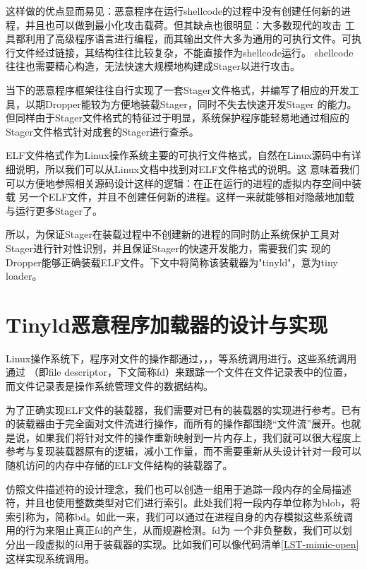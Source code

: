 这样做的优点显而易见：恶意程序在运行shellcode的过程中没有创建任何新的进程，并且也可以做到最小化攻击载荷。但其缺点也很明显：大多数现代的攻击
工具都利用了高级程序语言进行编程，而其输出文件大多为通用的可执行文件。可执行文件经过链接，其结构往往比较复杂，不能直接作为shellcode运行。
shellcode往往也需要精心构造，无法快速大规模地构建成Stager以进行攻击。

当下的恶意程序框架往往自行实现了一套Stager文件格式，并编写了相应的开发工具，以期Dropper能较为方便地装载Stager，同时不失去快速开发Stager
的能力。但同样由于Stager文件格式的特征过于明显，系统保护程序能轻易地通过相应的Stager文件格式针对成套的Stager进行查杀。

ELF文件格式作为Linux操作系统主要的可执行文件格式，自然在Linux源码中有详细说明，所以我们可以从Linux文档中找到对ELF文件格式的说明。这
意味着我们可以方便地参照相关源码设计这样的逻辑：在正在运行的进程的虚拟内存空间中装载
另一个ELF文件，并且不创建任何新的进程。这样一来就能够相对隐蔽地加载与运行更多Stager了。

所以，为保证Stager在装载过程中不创建新的进程的同时防止系统保护工具对Stager进行针对性识别，并且保证Stager的快速开发能力，需要我们实
现的Dropper能够正确装载ELF文件。下文中将简称该装载器为"tinyld"，意为tiny loader。

\section{Tinyld恶意程序加载器的设计与实现}

Linux操作系统下，程序对文件的操作都通过，，，等系统调用进行。这些系统调用通过
（即file descriptor，下文简称fd）来跟踪一个文件在文件记录表中的位置，而文件记录表是操作系统管理文件的数据结构。

为了正确实现ELF文件的装载器，我们需要对已有的装载器的实现进行参考。已有的装载器由于完全面对文件流进行操作，而所有的操作都围绕“文件流”展开。也就
是说，如果我们将针对文件的操作重新映射到一片内存上，我们就可以很大程度上参考与复现装载器原有的逻辑，减小工作量，而不需要重新从头设计针对一段可以
随机访问的内存中存储的ELF文件结构的装载器了。

仿照文件描述符的设计理念，我们也可以创造一组用于追踪一段内存的全局描述符，并且也使用整数类型对它们进行索引。此处我们将一段内存单位称为blob，将
索引称为，简称bd。如此一来，我们可以通过在进程自身的内存模拟这些系统调用的行为来阻止真正fd的产生，从而规避检测。fd为
一个非负整数，我们可以划分出一段虚拟的fd用于装载器的实现。比如我们可以像代码清单\ref{LST-mimic-open}这样实现系统调用。


